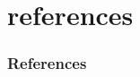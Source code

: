 %
%

\section{references}
\begin{frame}[allowframebreaks,t]
  \frametitle{References}
  
  {\footnotesize }
\end{frame}



